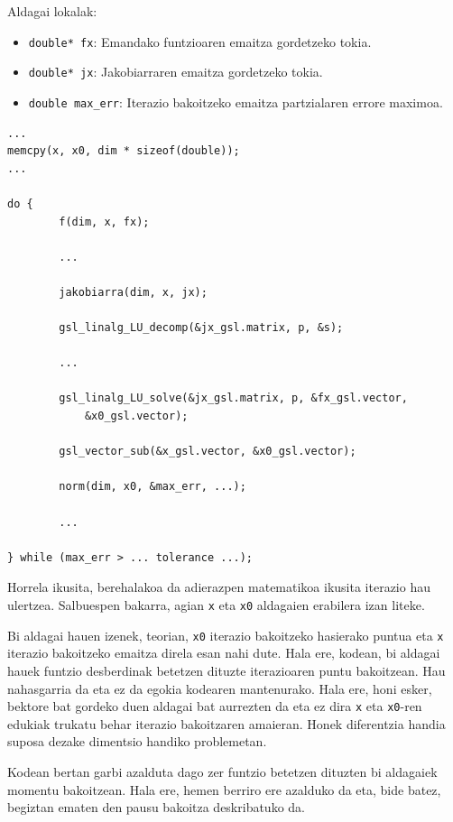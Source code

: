 \documentclass[10pt,a4paper,basque]{article}
\begin{document}
Aldagai lokalak:
\begin{itemize}
\item \verb|double* fx|: Emandako funtzioaren emaitza gordetzeko tokia.
\item \verb|double* jx|: Jakobiarraren emaitza gordetzeko tokia.
\item \verb|double max_err|: Iterazio bakoitzeko emaitza partzialaren errore maximoa.
\end{itemize}

\begin{lstlisting}
...
memcpy(x, x0, dim * sizeof(double));
...

do {
		f(dim, x, fx);
		
		...
		
		jakobiarra(dim, x, jx);
			
		gsl_linalg_LU_decomp(&jx_gsl.matrix, p, &s);
		
		...
		
		gsl_linalg_LU_solve(&jx_gsl.matrix, p, &fx_gsl.vector,
			&x0_gsl.vector);

		gsl_vector_sub(&x_gsl.vector, &x0_gsl.vector);
		
		norm(dim, x0, &max_err, ...);
		
		...

} while (max_err > ... tolerance ...);
\end{lstlisting}

Horrela ikusita, berehalakoa da adierazpen matematikoa ikusita iterazio hau ulertzea. Salbuespen bakarra, agian \verb|x| eta \verb|x0| aldagaien erabilera izan liteke.

Bi aldagai hauen izenek, teorian, \verb|x0| iterazio bakoitzeko hasierako puntua eta \verb|x| iterazio bakoitzeko emaitza direla esan nahi dute. Hala ere, kodean, bi aldagai hauek funtzio desberdinak betetzen dituzte iterazioaren puntu bakoitzean. Hau nahasgarria da eta ez da egokia kodearen mantenurako. Hala ere, honi esker, bektore bat gordeko duen aldagai bat aurrezten da eta ez dira \verb|x| eta \verb|x0|-ren edukiak trukatu behar iterazio bakoitzaren amaieran. Honek diferentzia handia suposa dezake dimentsio handiko problemetan.

Kodean bertan garbi azalduta dago zer funtzio betetzen dituzten bi aldagaiek momentu bakoitzean. Hala ere, hemen berriro ere azalduko da eta, bide batez, begiztan ematen den pausu bakoitza deskribatuko da.
\end{document}
